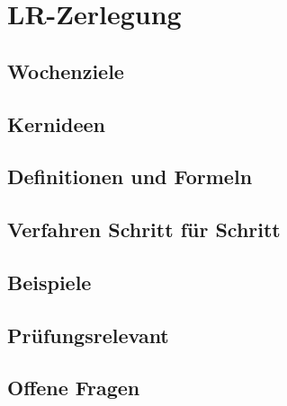 \chapter{LR-Zerlegung}
\label{kap:03-lr-zerlegung}

\section*{Wochenziele}
\begin{wochenziele}
\end{wochenziele}

\section{Kernideen}

\section{Definitionen und Formeln}

\section{Verfahren Schritt für Schritt}

\section{Beispiele}

\section{Prüfungsrelevant}

\section{Offene Fragen}
